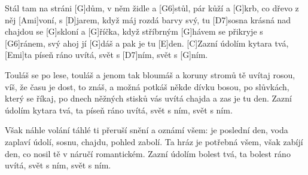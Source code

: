 
\sloka
[G]Stál tam na stráni [G\maj]dům, v něm židle a [G6]stůl,
pár kůží a [G]krb, co dřevo z něj [Ami]voní,
s [D]jarem, když máj rozdá barvy svý,
tu [D7]sosna krásná nad chajdou se [G]skloní
a [G]říčka, když stříbrným [G\maj]hávem se přikryje s [G6]ránem,
svý ahoj jí [G]dáš a pak je tu [E]den.
[C]Zazní údolím kytara tvá, [Emi]ta píseň ráno uvítá,
svět s [D7]ním, svět s [G]ním.

\sloka
Touláš se po lese, touláš a jenom tak bloumáš
a koruny stromů tě uvítaj rosou,
víš, že času je dost, to znáš,
a možná potkáš někde dívku bosou,
po slůvkách, který se říkaj, po dnech něžných stisků
vás uvítá chajda a zas je tu den.
Zazní údolím kytara tvá, ta píseň ráno uvítá,
svět s ním, svět s ním.

\sloka
Však náhle volání táhlé ti přeruší snění
a oznámí všem: je poslední den,
voda zaplaví údolí,
sosnu, chajdu, pohled zabolí.
Ta hráz je potřebná všem, však zabíjí den,
co nosil tě v náručí romantickém.
Zazní údolím bolest tvá, ta bolest ráno uvítá,
svět s ním, svět s ním.
